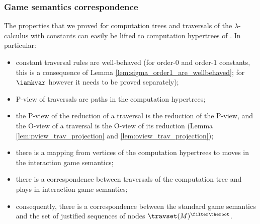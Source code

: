 \subsubsection{Game semantics correspondence}
The properties that we proved for computation trees and traversals
of the $\lambda$-calculus with constants can easily be lifted
to computation hypertrees of \ialgol. In particular:
\begin{itemize}
\item constant traversal rules are well-behaved (for order-$0$ and order-$1$ constants, this is a consequence
of Lemma \ref{lem:sigma_order1_are_wellbehaved}; for $\iamkvar$
however it needs to be proved separately);
\item P-view of traversals are paths in the computation hypertrees;
\item the P-view of the reduction of a traversal is the reduction of the P-view,
and the O-view of a traversal is the O-view of its reduction
(Lemma \ref{lem:pview_trav_projection} and
\ref{lem:oview_trav_projection});
\item there is a mapping from vertices of the computation hypertrees to moves in the interaction game semantics;
\item there is a correspondence between traversals of the computation tree and plays in interaction game semantics;
\item consequently, there is a correspondence between the standard game semantics and
the set of justified sequences of nodes $\travset(M)^{\filter
\theroot}$.
\end{itemize}
